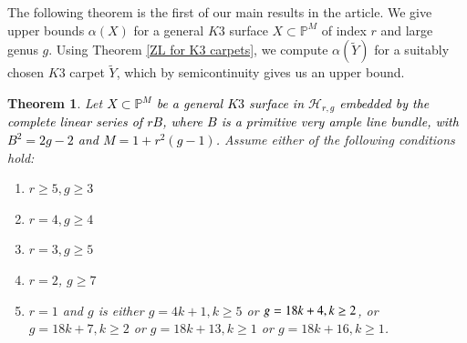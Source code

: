 \documentclass[11pt,twoside]{amsart}
\theoremstyle{plain}
\numberwithin{equation}{section}
\newtheorem{theorem}{Theorem}[section]
\theoremstyle{definition}
\begin{document}
The following theorem is the first of our main results in the article. We give upper bounds $\alpha(X)$ for a general $K3$ surface $X \subset \mathbb{P}^M$ of index $r$ and large genus $g$. Using Theorem \ref{ZL for K3 carpets}, we compute $\alpha(\widetilde{Y})$ for a suitably chosen $K3$ carpet $\widetilde{Y}$, which by semicontinuity gives us an upper bound. 


\begin{theorem}\label{non-extendability of K3 surfaces}
    Let \textcolor{black}{$X \subset \mathbb{P}^{M}$ be a general $K3$ surface in $\mathcal{H}_{r,g}$ embedded by the complete linear series of $rB$, where $B$ is a primitive very ample line bundle, with $B^2 = 2g-2$ and $M = 1+r^2(g-1)$.} Assume either of the following conditions hold:
    \begin{enumerate}
        \item[(1)] $r \geq 5, g \geq 3$
        \item[(2)] $r = 4, g \geq 4$
        \item[(3)] $r = 3, g \geq 5$ 
        \item[(4)] $r = 2$, $g \geq 7$ 
        \item[(5)] $r = 1$ and $g$ is either $g = 4k+1, k \geq 5$ or $g = 18k+4, \textcolor{black}{k \geq 2
        }$, or $g = 18k+7, k \geq 2$ or $g = 18k+13, k \geq 1$ or $g = 18k+16, k \geq 1$.
        
        
        
        
    \end{enumerate}
\end{theorem}
\end{document}
